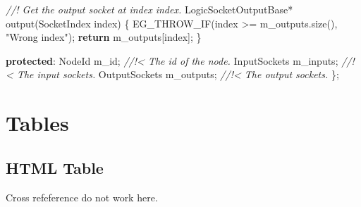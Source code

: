 \documentclass[
  12pt,
  british,
  a4paper,
  twoside,
  titlepage,
  openright,
  numbers=noenddot,
  chapterprefix=true,
  headings=optiontohead,
  svgnames,
  dvipsnames]{scrreprt}
\newenvironment{Shaded}{}{}
\newcommand{\CommentTok}[1]{\textcolor[rgb]{0.38,0.63,0.69}{\textit{#1}}}
\newcommand{\ControlFlowTok}[1]{\textcolor[rgb]{0.00,0.44,0.13}{\textbf{#1}}}
\newcommand{\KeywordTok}[1]{\textcolor[rgb]{0.00,0.44,0.13}{\textbf{#1}}}
\newcommand{\NormalTok}[1]{#1}
\newcommand{\StringTok}[1]{\textcolor[rgb]{0.25,0.44,0.63}{#1}}
\newcommand{\VariableTok}[1]{\textcolor[rgb]{0.10,0.09,0.49}{#1}}
\begin{document}
\begin{Shaded}
\begin{Highlighting}[numbers=left,,]
    \CommentTok{//! Get the output socket at index \textasciigrave{}index\textasciigrave{}.}
\NormalTok{    LogicSocketOutputBase* output(SocketIndex index)}
\NormalTok{    \{}
\NormalTok{        EG\_THROW\_IF(index \textgreater{}= }\VariableTok{m\_outputs}\NormalTok{.size(), }\StringTok{"Wrong index"}\NormalTok{);}
        \ControlFlowTok{return} \VariableTok{m\_outputs}\NormalTok{[index];}
\NormalTok{    \}}

\KeywordTok{protected}\NormalTok{:}
\NormalTok{    NodeId }\VariableTok{m\_id}\NormalTok{;              }\CommentTok{//!\textless{} The id of the node.}
\NormalTok{    InputSockets }\VariableTok{m\_inputs}\NormalTok{;    }\CommentTok{//!\textless{} The input sockets.}
\NormalTok{    OutputSockets }\VariableTok{m\_outputs}\NormalTok{;  }\CommentTok{//!\textless{} The output sockets.}
\NormalTok{\};}
\end{Highlighting}
\end{Shaded}

\hypertarget{tables}{%
\chapter{Tables}\label{tables}}

\hypertarget{html-table}{%
\section{HTML Table}\label{html-table}}

Cross refeference do not work here.
\end{document}
